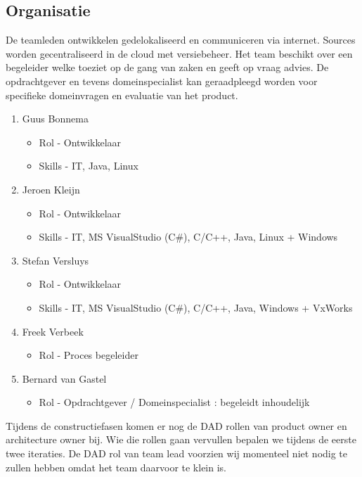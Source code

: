 \subsection{Organisatie}
 De teamleden ontwikkelen gedelokaliseerd en communiceren via internet. Sources worden gecentraliseerd
 in de cloud met versiebeheer. Het team beschikt over een begeleider welke toeziet op de gang van zaken
 en geeft op vraag advies. De opdrachtgever en tevens domeinspecialist kan geraadpleegd worden voor
 specifieke domeinvragen en evaluatie van het product.
 \begin{enumerate}
 	\item Guus Bonnema
 	\begin{itemize}
		\item Rol - Ontwikkelaar
		\item Skills - IT, Java, Linux
	\end{itemize}
 	\item Jeroen Kleijn
 	\begin{itemize}
		\item Rol - Ontwikkelaar
		\item Skills - IT,  MS VisualStudio (C\#), C/C++, Java, Linux + Windows
	\end{itemize}
 	\item Stefan Versluys
 	\begin{itemize}
		\item Rol - Ontwikkelaar
		\item Skills - IT,  MS VisualStudio (C\#), C/C++, Java, Windows + VxWorks
	\end{itemize}
	\item Freek Verbeek
	\begin{itemize}
		\item Rol - Proces begeleider
	\end{itemize}
	\item Bernard van Gastel
	\begin{itemize}
		\item Rol - Opdrachtgever / Domeinspecialist : begeleidt inhoudelijk
	\end{itemize}
 \end{enumerate}

 Tijdens de constructiefasen komen er nog de DAD rollen van product owner en architecture owner bij.
 Wie die rollen gaan vervullen bepalen we tijdens de eerste twee iteraties. De DAD rol van team lead
 voorzien wij momenteel niet nodig te zullen hebben omdat het team daarvoor te klein is.


